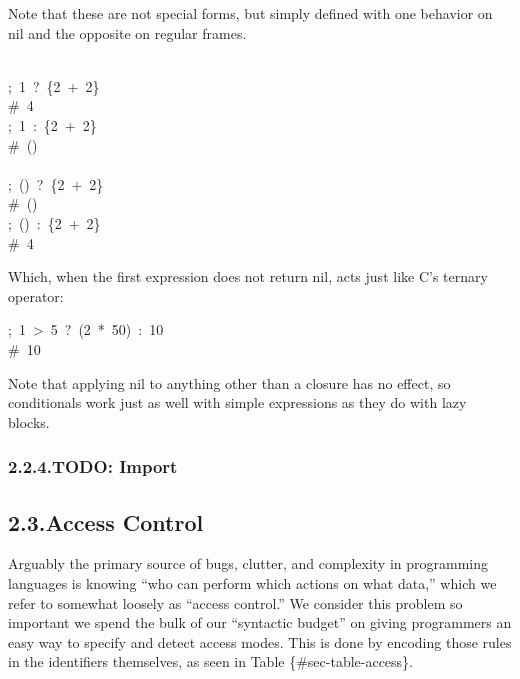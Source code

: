\documentclass[preprint]{{sigplanconf}}
\begin{document}
Note that these are not special forms, but simply defined with one behavior on nil
and the opposite on regular frames.%
\begin{mdpre}%
\noindent\\
;~1~{?}~\{2~+~2\}\\
{\#~4}\\
;~1~{:}~\{2~+~2\}\\
{\#~()}\\
\\
;~()~{?}~\{2~+~2\}\\
{\#~()}\\
;~()~{:}~\{2~+~2\}\\
{\#~4}%
\end{mdpre}\noindent{}Which, when the first expression does not return nil, acts just like C's ternary
operator:
\begin{mdpre}%
\noindent;~1~\textgreater{}~5~{?}~(2~*~{50})~{:}~{10}\\
{\#~10}%
\end{mdpre}\noindent{}Note that applying nil to anything other than a closure has no effect, so conditionals
work just as well with simple expressions as they do with lazy blocks.

\subsubsection{2.2.4.\hspace*{0.5em}TODO: Import}\label{sec-todo--import}%

\subsection{2.3.\hspace*{0.5em}Access Control}\label{sec-access}%

\noindent{}Arguably the primary source of bugs, clutter, and complexity in
programming languages is knowing \textquotedblleft{}who can perform which actions on what data,\textquotedblright{}
which we refer to somewhat loosely as \textquotedblleft{}access control.\textquotedblright{} We consider this
problem so important we spend the bulk of our \textquotedblleft{}syntactic budget\textquotedblright{} on
giving programmers an easy way to specify and detect access modes. This
is done by encoding those rules in the identifiers themselves, as seen in
Table \{\#sec-table-access\}.%
\end{document}
